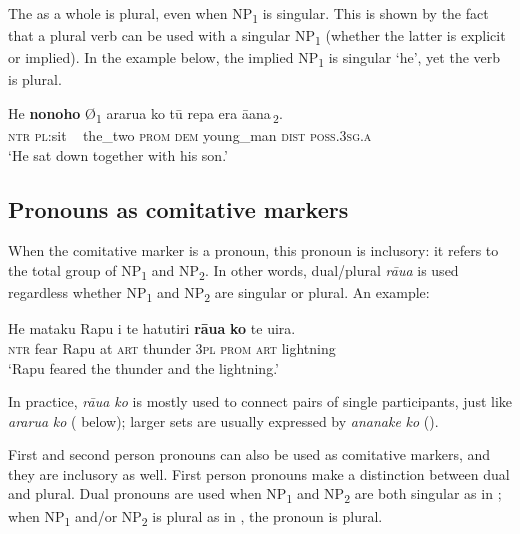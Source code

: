 The  as a whole is plural, even when NP\textsubscript{1} is singular. This is shown by the fact that a plural verb can be used with a singular NP\textsubscript{1} (whether the latter is explicit or implied). In the example below, the implied NP\textsubscript{1} is singular ‘he’, yet the verb is plural. 

\ea\label{ex:8.192}
\gll He \textbf{nonoho} \textup{Ø\textsubscript{1}} ararua ko {\ob}tū repa era {\ꞌ}ā{\ꞌ}ana\,{\cb}\textsubscript{\textup{2}}.\\
\textsc{ntr} \textsc{pl}:sit ~ the\_two \textsc{prom} {\db}\textsc{dem} young\_man \textsc{dist} \textsc{poss.3sg.a}\\

\glt 
‘He sat down together with his son.’ \textstyleExampleref{[R310.020]} 
\z

\subsection{Pronouns as comitative markers}\label{sec:8.10.2}
When the comitative marker is a pronoun, this pronoun is inclusory: it refers to the total group of NP\textsubscript{1} and NP\textsubscript{2}. In other words, dual/plural \textit{rāua} is used regardless whether NP\textsubscript{1} and NP\textsubscript{2} are singular or plural. An example:

\ea\label{ex:8.193}
\gll He mataku Rapu {\ꞌ}i te hatutiri \textbf{rāua} \textbf{ko} te {\ꞌ}uira.\\
\textsc{ntr} fear Rapu at \textsc{art} thunder \textsc{3pl} \textsc{prom} \textsc{art} lightning\\

\glt
‘Rapu feared the thunder and the lightning.’ \textstyleExampleref{[Fel-40-028]}
\z

In practice, \textit{rāua ko} is mostly used to connect pairs of single participants, just like \textit{ararua} \textit{ko} ( below); larger sets are usually expressed by \textit{ananake} \textit{ko} ().

First and second person pronouns can also be used as comitative markers, and they are inclusory as well. First person pronouns make a distinction between dual and plural. Dual pronouns are used when NP\textsubscript{1} and NP\textsubscript{2} are both singular as in ; when NP\textsubscript{1} and/or NP\textsubscript{2} is plural as in , the pronoun is plural. 

